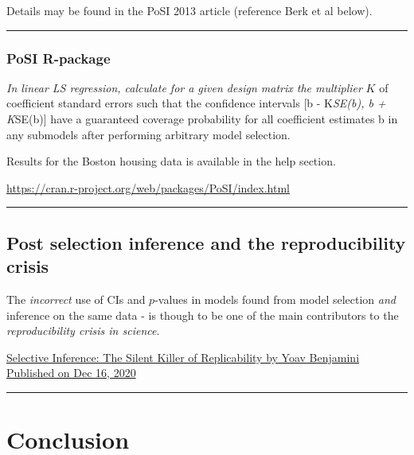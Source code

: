 \documentclass[
  letterpaper,
  DIV=11,
  numbers=noendperiod]{scrartcl}
\begin{document}
Details may be found in the PoSI 2013 article (reference Berk et al
below).

\begin{center}\rule{0.5\linewidth}{0.5pt}\end{center}

\hypertarget{posi-r-package}{%
\subsubsection{PoSI R-package}\label{posi-r-package}}

\emph{In linear LS regression, calculate for a given design matrix the
multiplier} \(K\) of coefficient standard errors such that the
confidence intervals {[}b - K\emph{SE(b), b + K}SE(b){]} have a
guaranteed coverage probability for all coefficient estimates b in any
submodels after performing arbitrary model selection.

Results for the Boston housing data is available in the help section.

\url{https://cran.r-project.org/web/packages/PoSI/index.html}

\begin{center}\rule{0.5\linewidth}{0.5pt}\end{center}

\hypertarget{post-selection-inference-and-the-reproducibility-crisis}{%
\subsection{Post selection inference and the reproducibility
crisis}\label{post-selection-inference-and-the-reproducibility-crisis}}

The \emph{incorrect} use of CIs and \(p\)-values in models found from
model selection \emph{and} inference on the same data - is though to be
one of the main contributors to the \emph{reproducibility crisis in
science}.

\href{https://hdsr.mitpress.mit.edu/pub/l39rpgyc/release/1}{Selective
Inference: The Silent Killer of Replicability by Yoav Benjamini
Published on Dec 16, 2020}

\begin{center}\rule{0.5\linewidth}{0.5pt}\end{center}

\hypertarget{conclusion-1}{%
\section{Conclusion}\label{conclusion-1}}
\end{document}

